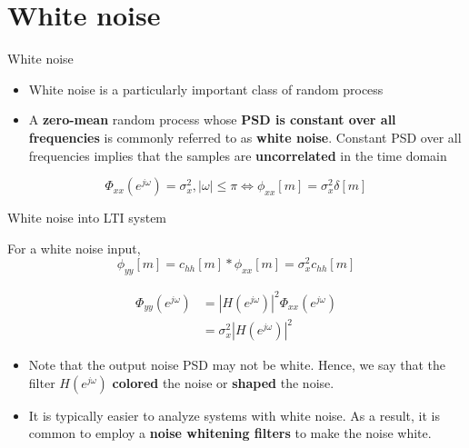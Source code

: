 \documentclass[10pt]{beamer}
\begin{document}
\section{White noise}
\begin{frame}{White noise}

\begin{itemize}
	\item White noise is a particularly important class of random process
	\item A \textbf{zero-mean} random process whose \textbf{PSD is constant over all frequencies} is commonly referred to as \textbf{white noise}. Constant PSD over all frequencies implies that the samples are \textbf{uncorrelated} in the time domain
\end{itemize}

\begin{equation*}
\Phi_{xx}(e^{j\omega}) = \sigma_x^2, |\omega|\leq\pi \Longleftrightarrow \phi_{xx}[m] = \sigma_x^2\delta[m]  
\end{equation*}

\begin{center}
	\resizebox{0.7\linewidth}{!}{}
\end{center}

\end{frame}

\begin{frame}{White noise into LTI system}

For a white noise input, 
\begin{equation*} \tag{output autocorrelation function}
\phi_{yy}[m] = c_{hh}[m]\ast \phi_{xx}[m] = \sigma_x^2c_{hh}[m]
\end{equation*}

\begin{align*} 
\Phi_{yy}(e^{j\omega}) &= |H(e^{j\omega})|^2\Phi_{xx}(e^{j\omega}) \\
&= \sigma_x^2|H(e^{j\omega})|^2 \tag{output PSD}
\end{align*}

\begin{itemize}
	\item Note that the output noise PSD may not be white. Hence, we say that the filter $H(e^{j\omega})$ \textbf{colored} the noise or \textbf{shaped} the noise.
	\item It is typically easier to analyze systems with white noise. As a result, it is common to employ a \textbf{noise whitening filters} to make the noise white. 
\end{itemize}


\end{frame}
\end{document}
